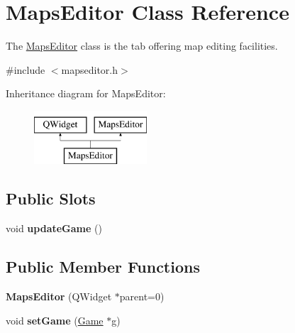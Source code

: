 \hypertarget{class_maps_editor}{\section{\-Maps\-Editor \-Class \-Reference}
\label{class_maps_editor}
}


\-The \hyperlink{class_maps_editor}{\-Maps\-Editor} class is the tab offering map editing facilities.  




{\ttfamily \#include $<$mapseditor.\-h$>$}

\-Inheritance diagram for \-Maps\-Editor\-:\begin{figure}[H]
\begin{center}
\leavevmode
\includegraphics[height=2.000000cm]{class_maps_editor}
\end{center}
\end{figure}
\subsection*{\-Public \-Slots}
\begin{DoxyCompactItemize}
\item 
\hypertarget{class_maps_editor_a8bed7de9beb523be5c9568927def310f}{void {\bfseries update\-Game} ()}\label{class_maps_editor_a8bed7de9beb523be5c9568927def310f}

\end{DoxyCompactItemize}
\subsection*{\-Public \-Member \-Functions}
\begin{DoxyCompactItemize}
\item 
\hypertarget{class_maps_editor_aff2b57188162ccabbad0583e585bd622}{{\bfseries \-Maps\-Editor} (\-Q\-Widget $\ast$parent=0)}\label{class_maps_editor_aff2b57188162ccabbad0583e585bd622}

\item 
\hypertarget{class_maps_editor_acdb6e263aff6bea6e0f089da3e6e4a3e}{void {\bfseries set\-Game} (\hyperlink{class_game}{\-Game} $\ast$g)}\label{class_maps_editor_acdb6e263aff6bea6e0f089da3e6e4a3e}

\end{DoxyCompactItemize}


